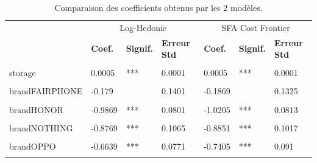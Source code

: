 \documentclass[
  12pt,
]{report}
\begin{document}
\begin{table}[!h]
\centering
\caption{\label{tab:loghedonic_sfa_comp}Comparaison des coefficients obtenus par les 2 modèles.}
\centering
\begin{tabular}[t]{lllllll}
\toprule
\multicolumn{1}{c}{ } & \multicolumn{3}{c}{Log-Hedonic} & \multicolumn{3}{c}{SFA Cost Frontier} \\
\cmidrule(l{3pt}r{3pt}){2-4} \cmidrule(l{3pt}r{3pt}){5-7}
\textbf{ } & \textbf{Coef.} & \textbf{Signif.} & \textbf{Erreur Std} & \textbf{Coef.} & \textbf{Signif.} & \textbf{Erreur Std}\\
\midrule
\cellcolor{gray!10}{(Intercept)} & \cellcolor{gray!10}{4.3197} & \cellcolor{gray!10}{***} & \cellcolor{gray!10}{0.2526} & \cellcolor{gray!10}{4.0863} & \cellcolor{gray!10}{***} & \cellcolor{gray!10}{0.2543}\\
storage & 0.0005 & *** & 0.0001 & 0.0005 & *** & 0.0001\\
\cellcolor{gray!10}{brandASUS} & \cellcolor{gray!10}{-0.357} & \cellcolor{gray!10}{**} & \cellcolor{gray!10}{0.1091} & \cellcolor{gray!10}{-0.3849} & \cellcolor{gray!10}{***} & \cellcolor{gray!10}{0.1092}\\
brandFAIRPHONE & -0.179 &  & 0.1401 & -0.1869 &  & 0.1325\\
\cellcolor{gray!10}{brandGOOGLE} & \cellcolor{gray!10}{-0.4298} & \cellcolor{gray!10}{***} & \cellcolor{gray!10}{0.0897} & \cellcolor{gray!10}{-0.5019} & \cellcolor{gray!10}{***} & \cellcolor{gray!10}{0.099}\\
\addlinespace
brandHONOR & -0.9869 & *** & 0.0801 & -1.0205 & *** & 0.0813\\
\cellcolor{gray!10}{brandMOTOROLA} & \cellcolor{gray!10}{-0.7181} & \cellcolor{gray!10}{***} & \cellcolor{gray!10}{0.0732} & \cellcolor{gray!10}{-0.7885} & \cellcolor{gray!10}{***} & \cellcolor{gray!10}{0.0863}\\
brandNOTHING & -0.8769 & *** & 0.1065 & -0.8851 & *** & 0.1017\\
\cellcolor{gray!10}{brandONEPLUS} & \cellcolor{gray!10}{-0.6518} & \cellcolor{gray!10}{***} & \cellcolor{gray!10}{0.1065} & \cellcolor{gray!10}{-0.6815} & \cellcolor{gray!10}{***} & \cellcolor{gray!10}{0.1044}\\
brandOPPO & -0.6639 & *** & 0.0771 & -0.7405 & *** & 0.091\\
\addlinespace
\cellcolor{gray!10}{brandREALME} & \cellcolor{gray!10}{-0.6436} & \cellcolor{gray!10}{***} & \cellcolor{gray!10}{0.0795} & \cellcolor{gray!10}{-0.6727} & \cellcolor{gray!10}{***} & \cellcolor{gray!10}{0.0798}\\

\end{tabular}
\end{table}
\end{document}
